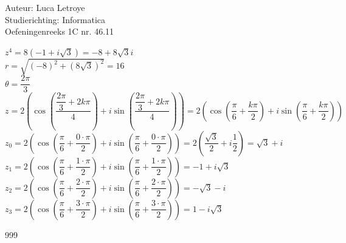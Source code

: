 \documentclass[a4paper]{article}
\begin{document}
  
\noindent \large Auteur: Luca Letroye        \\
\noindent \large Studierichting: Informatica \\
\noindent \large Oefeningenreeks 1C nr. 46.11 \\

\medskip

\normalsize

$z^4 = 8(-1 + i\sqrt{3}) = -8+8\sqrt{3}i$\\

$r = \sqrt{(-8)^2 + (8\sqrt{3})^2} = 16$\\

$\theta = \dfrac{2\pi}{3}$\\

$z = 2\left(\cos \left(\dfrac{\dfrac{2\pi}{3}+2k\pi}{4}\right) + i \sin \left(\dfrac{\dfrac{2\pi}{3}+2k\pi}{4}\right) \right) = 2\left(\cos \left(\dfrac{\pi}{6} + \dfrac{k\pi}{2}\right) + i \sin \left(\dfrac{\pi}{6} + \dfrac{k\pi}{2}\right)\right ) $\\

$z_0 = 2\left(\cos \left(\dfrac{\pi}{6} + \dfrac{0\cdot \pi}{2}\right) + i \sin \left(\dfrac{\pi}{6} + \dfrac{0 \cdot \pi}{2}\right)\right ) = 2\left(\dfrac{\sqrt{3}}{2} + i\dfrac{1}{2}\right ) = \sqrt{3} + i $\\

$z_1 = 2\left(\cos \left(\dfrac{\pi}{6} + \dfrac{1\cdot \pi}{2}\right) + i \sin \left(\dfrac{\pi}{6} + \dfrac{1 \cdot \pi}{2}\right)\right ) = -1+i\sqrt{3} $\\

$z_2 = 2\left(\cos \left(\dfrac{\pi}{6} + \dfrac{2\cdot \pi}{2}\right) + i \sin \left(\dfrac{\pi}{6} + \dfrac{2 \cdot \pi}{2}\right)\right ) = -\sqrt{3} - i $\\

$z_3 = 2\left(\cos \left(\dfrac{\pi}{6} + \dfrac{3\cdot \pi}{2}\right) + i \sin \left(\dfrac{\pi}{6} + \dfrac{3 \cdot \pi}{2}\right)\right ) = 1 -i\sqrt{3} $\\


\begin{thebibliography}{999}
\end{thebibliography}
\end{document}
